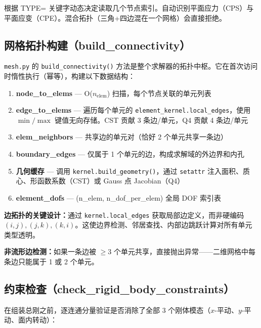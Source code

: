 \documentclass[12pt,a4paper]{ctexart}
\begin{document}
根据 TYPE= 关键字动态决定读取几个节点索引。自动识别平面应力（CPS）与平面应变（CPE）。混合拓扑（三角+四边混在一个网格）会直接拒绝。

\subsection{网格拓扑构建（build\_connectivity）}

\texttt{mesh.py} 的 \texttt{build\_connectivity()} 方法是整个求解器的拓扑中枢。它在首次访问时惰性执行（幂等），构建以下数据结构：

\begin{enumerate}[leftmargin=*]
  \item \textbf{node\_to\_elems} — O($n_{\text{elem}}$) 扫描，每个节点关联的单元列表
  \item \textbf{edge\_to\_elems} — 遍历每个单元的 \texttt{element\_kernel.local\_edges}，使用 $\min/\max$ 键值无向存储。CST 贡献 3 条边/单元，Q4 贡献 4 条边/单元
  \item \textbf{elem\_neighbors} — 共享边的单元对（恰好 2 个单元共享一条边）
  \item \textbf{boundary\_edges} — 仅属于 1 个单元的边，构成求解域的外边界和内孔
  \item \textbf{几何缓存} — 调用 \texttt{kernel.build\_geometry()}，通过 \texttt{setattr} 注入面积、质心、形函数系数（CST）或 Gauss 点 Jacobian（Q4）
  \item \textbf{element\_dofs} — (n\_elem, n\_dof\_per\_elem) 全局 DOF 索引表
\end{enumerate}

\textbf{边拓扑的关键设计：}通过 \texttt{kernel.local\_edges} 获取局部边定义，而非硬编码 $(i,j),(j,k),(k,i)$。这使边界检测、邻居查找、内部边跳跃计算对所有单元类型透明。

\textbf{非流形边检测：}如果一条边被 $\ge 3$ 个单元共享，直接抛出异常——二维网格中每条边只能属于 1 或 2 个单元。

\subsection{约束检查（check\_rigid\_body\_constraints）}

在组装总刚之前，逐连通分量验证是否消除了全部 3 个刚体模态（$x$-平动、$y$-平动、面内转动）：
\end{document}
